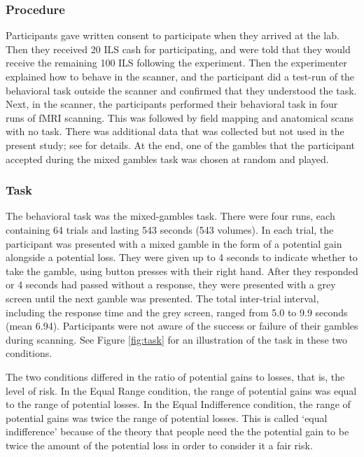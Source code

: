 \documentclass[a4paper,doc,natbib]{apa6}
\begin{document}
\subsubsection{Procedure}
Participants gave written consent to participate when they arrived at the lab. Then they received 20 ILS cash for participating, and were told that they would receive the remaining 100 ILS following the experiment. Then the experimenter explained how to behave in the scanner, and the participant did a test-run of the behavioral task outside the scanner and confirmed that they understood the task. Next, in the scanner, the participants performed their behavioral task in four runs of fMRI scanning. This was followed by field mapping and anatomical scans with no task. There was additional data that was collected but not used in the present study; see \cite{botvinik-nezer_fmri_2019} for details. At the end, one of the gambles that the participant accepted during the mixed gambles task was chosen at random and played. 

\subsubsection{Task} \label{sec:task}
The behavioral task was the mixed-gambles task. There were four runs, each containing 64 trials and lasting 543 seconds (543 volumes). In each trial, the participant was presented with a mixed gamble in the form of a potential gain alongside a potential loss. They were given up to 4 seconds to indicate whether to take the gamble, using button presses with their right hand. After they responded or 4 seconds had passed without a response, they were presented with a grey screen until the next gamble was presented. The total inter-trial interval, including the response time and the grey screen, ranged from 5.0 to 9.9 seconds (mean 6.94). Participants were not aware of the success or failure of their gambles during scanning. See Figure \ref{fig:task} for an illustration of the task in these two conditions. 

The two conditions differed in the ratio of potential gains to losses, that is, the level of risk. In the  Equal Range condition, the range of potential gains was equal to the range of potential losses. In the Equal Indifference condition, the range of potential gains was twice the range of potential losses. This is called `equal indifference' because of the theory that people need the the potential gain to be twice the amount of the potential loss in order to consider it a fair risk. 
\end{document}
